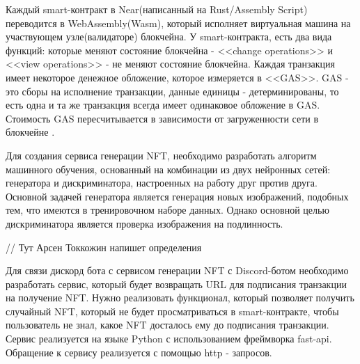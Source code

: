 \begin{remark}
    Каждый smart-контракт в Near(написанный на Rust/Assembly Script) переводится в WebAssembly(Wasm), который исполняет виртуальная машина на участвующем узле(валидаторе) блокчейна. У smart-контракта, есть два вида функций: которые меняют состояние блокчейна - <<change operations>> и <<view operations>> - не меняют состояние блокчейна. Каждая транзакция имеет некоторое денежное обложение, которое измеряется в <<GAS>>. GAS - это сборы на исполнение транзакции, данные единицы - детерминированы, то есть одна и та же транзакция всегда имеет одинаковое обложение в GAS. Стоимость GAS пересчитывается в зависимости от загруженности сети в блокчейне \cite{neargas}.
\end{remark}

Для создания сервиса генерации NFT, необходимо разработать алгоритм машинного обучения, основанный на комбинации из двух нейронных сетей: генератора и дискриминатора, настроенных на работу друг против друга. Основной задачей генератора является генерация новых изображений, подобных тем, что имеются в тренировочном наборе данных. Однако основной целью дискриминатора является проверка изображения на подлинность.

// Тут Арсен Токкожин напишет определения

Для связи дискорд бота с сервисом генерации NFT  с Discord-ботом необходимо разработать сервис, который будет возвращать URL для подписания транзакции на получение NFT. Нужно реализовать функционал, который позволяет получить случайный NFT, который не будет просматриваться в smart-контракте, чтобы пользователь не знал, какое NFT досталось ему до подписания транзакции. Сервис реализуется на языке Python с использованием фреймворка fast-api. Обращение к сервису реализуется с помощью http - запросов.


